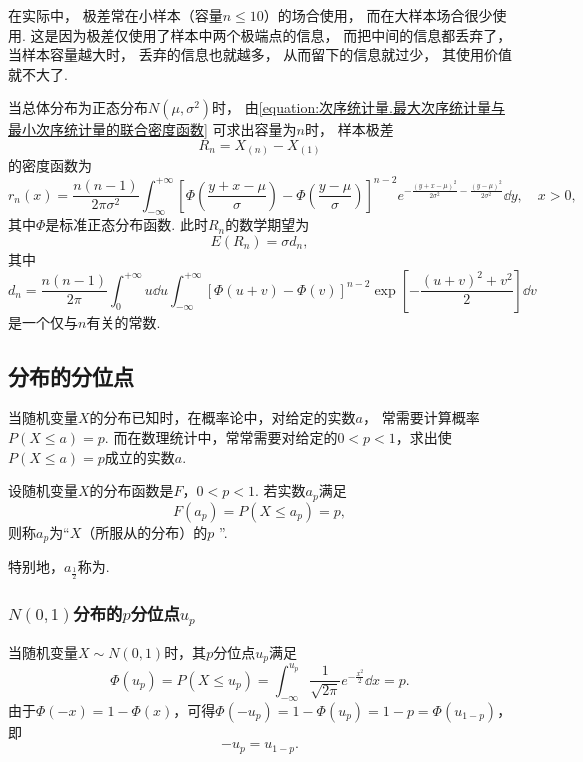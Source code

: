 在实际中，
极差常在小样本（容量\(n\leq10\)）的场合使用，
而在大样本场合很少使用.
这是因为极差仅使用了样本中两个极端点的信息，
而把中间的信息都丢弃了，
当样本容量越大时，
丢弃的信息也就越多，
从而留下的信息就过少，
其使用价值就不大了.

当总体分布为正态分布\(N(\mu,\sigma^2)\)时，
由\cref{equation:次序统计量.最大次序统计量与最小次序统计量的联合密度函数}
可求出容量为\(n\)时，
样本极差
\begin{equation}
	R_n
	= X_{(n)} - X_{(1)}
\end{equation}
的密度函数为
\begin{equation}
	r_n(x)
	= \frac{n(n-1)}{2\pi\sigma^2}
	\int_{-\infty}^{+\infty} \left[
		\Phi\left(
			\frac{y+x-\mu}{\sigma}
		\right)
		- \Phi\left(
			\frac{y-\mu}{\sigma}
		\right)
	\right]^{n-2}
	e^{
		-\frac{(y+x-\mu)^2}{2\sigma^2}
		-\frac{(y-\mu)^2}{2\sigma^2}
	}
	\dd{y},
	\quad x>0,
\end{equation}
其中\(\Phi\)是标准正态分布函数.
此时\(R_n\)的数学期望为
\begin{equation}
	E(R_n)
	= \sigma d_n,
\end{equation}
其中\[
	d_n
	= \frac{n(n-1)}{2\pi}
	\int_0^{+\infty} u \dd{u}
	\int_{-\infty}^{+\infty}
	[\Phi(u+v) - \Phi(v)]^{n-2}
	\exp[
		-\frac{(u+v)^2+v^2}{2}
	]
	\dd{v}
\]是一个仅与\(n\)有关的常数.

\subsection{分布的分位点}
当随机变量\(X\)的分布已知时，在概率论中，对给定的实数\(a\)，
常需要计算概率\(P(X \leq a) = p\).
而在数理统计中，常常需要对给定的\(0<p<1\)，求出使\(P(X \leq a) = p\)成立的实数\(a\).

\begin{definition}
设随机变量\(X\)的分布函数是\(F\)，\(0<p<1\).
若实数\(a_p\)满足\begin{equation}
	F(a_p) = P(X \leq a_p) = p,
\end{equation}
则称\(a_p\)为“\(X\)（所服从的分布）的\(p\) ”.

特别地，\(a_{\frac{1}{2}}\)称为.
\end{definition}

\subsubsection{\texorpdfstring{\(N(0,1)\)分布的\(p\)分位点\(u_p\)}{标准正态分布的p分位点}}
当随机变量\(X \sim N(0,1)\)时，其\(p\)分位点\(u_p\)满足\[
\Phi(u_p)
= P(X \leq u_p)
= \int_{-\infty}^{u_p} \frac{1}{\sqrt{2\pi}} e^{-\frac{x^2}{2}} \dd{x}
= p.
\]由于\(\Phi(-x)=1-\Phi(x)\)，可得\(\Phi(-u_p)=1-\Phi(u_p)=1-p=\Phi(u_{1-p})\)，即\begin{equation}
-u_p=u_{1-p}.
\end{equation}

